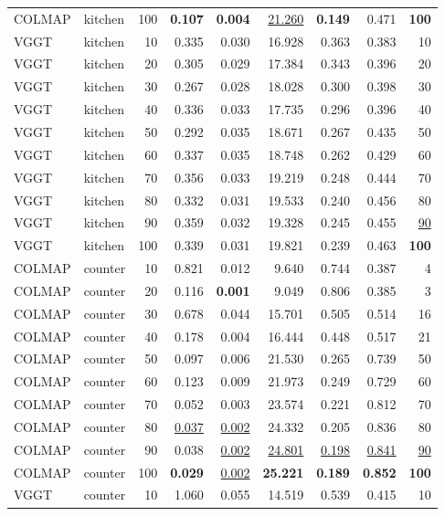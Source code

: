 \begin{table}[H]
\begin{tabular}{llrrrrrrr}
COLMAP & kitchen & 100 & \textbf{0.107} & \textbf{0.004} & \underline{21.260} & \textbf{0.149} & 0.471 & \textbf{100} \\
VGGT & kitchen & 10 & 0.335 & 0.030 & 16.928 & 0.363 & 0.383 & 10 \\
VGGT & kitchen & 20 & 0.305 & 0.029 & 17.384 & 0.343 & 0.396 & 20 \\
VGGT & kitchen & 30 & 0.267 & 0.028 & 18.028 & 0.300 & 0.398 & 30 \\
VGGT & kitchen & 40 & 0.336 & 0.033 & 17.735 & 0.296 & 0.396 & 40 \\
VGGT & kitchen & 50 & 0.292 & 0.035 & 18.671 & 0.267 & 0.435 & 50 \\
VGGT & kitchen & 60 & 0.337 & 0.035 & 18.748 & 0.262 & 0.429 & 60 \\
VGGT & kitchen & 70 & 0.356 & 0.033 & 19.219 & 0.248 & 0.444 & 70 \\
VGGT & kitchen & 80 & 0.332 & 0.031 & 19.533 & 0.240 & 0.456 & 80 \\
VGGT & kitchen & 90 & 0.359 & 0.032 & 19.328 & 0.245 & 0.455 & \underline{90} \\
VGGT & kitchen & 100 & 0.339 & 0.031 & 19.821 & 0.239 & 0.463 & \textbf{100} \\
\midrule
COLMAP & counter & 10 & 0.821 & 0.012 & 9.640 & 0.744 & 0.387 & 4 \\
COLMAP & counter & 20 & 0.116 & \textbf{0.001} & 9.049 & 0.806 & 0.385 & 3 \\
COLMAP & counter & 30 & 0.678 & 0.044 & 15.701 & 0.505 & 0.514 & 16 \\
COLMAP & counter & 40 & 0.178 & 0.004 & 16.444 & 0.448 & 0.517 & 21 \\
COLMAP & counter & 50 & 0.097 & 0.006 & 21.530 & 0.265 & 0.739 & 50 \\
COLMAP & counter & 60 & 0.123 & 0.009 & 21.973 & 0.249 & 0.729 & 60 \\
COLMAP & counter & 70 & 0.052 & 0.003 & 23.574 & 0.221 & 0.812 & 70 \\
COLMAP & counter & 80 & \underline{0.037} & \underline{0.002} & 24.332 & 0.205 & 0.836 & 80 \\
COLMAP & counter & 90 & 0.038 & \underline{0.002} & \underline{24.801} & \underline{0.198} & \underline{0.841} & \underline{90} \\
COLMAP & counter & 100 & \textbf{0.029} & \underline{0.002} & \textbf{25.221} & \textbf{0.189} & \textbf{0.852} & \textbf{100} \\
VGGT & counter & 10 & 1.060 & 0.055 & 14.519 & 0.539 & 0.415 & 10 \\

\end{tabular}
\end{table}
